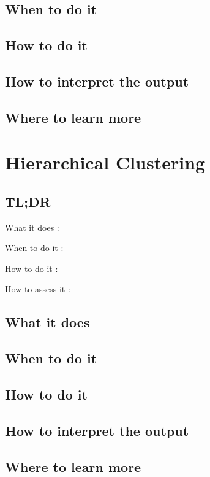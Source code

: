 \documentclass[
]{book}
\begin{document}
\hypertarget{when-to-do-it-22}{%
\section{When to do it}\label{when-to-do-it-22}}

\hypertarget{how-to-do-it-22}{%
\section{How to do it}\label{how-to-do-it-22}}

\hypertarget{how-to-interpret-the-output-22}{%
\section{How to interpret the output}\label{how-to-interpret-the-output-22}}

\hypertarget{where-to-learn-more-22}{%
\section{Where to learn more}\label{where-to-learn-more-22}}

\hypertarget{hierarchical-clustering}{%
\chapter{Hierarchical Clustering}\label{hierarchical-clustering}}

\hypertarget{tldr-23}{%
\section{TL;DR}\label{tldr-23}}

What it does
:

When to do it
:

How to do it
:

How to assess it
:

\hypertarget{what-it-does-23}{%
\section{What it does}\label{what-it-does-23}}

\hypertarget{when-to-do-it-23}{%
\section{When to do it}\label{when-to-do-it-23}}

\hypertarget{how-to-do-it-23}{%
\section{How to do it}\label{how-to-do-it-23}}

\hypertarget{how-to-interpret-the-output-23}{%
\section{How to interpret the output}\label{how-to-interpret-the-output-23}}

\hypertarget{where-to-learn-more-23}{%
\section{Where to learn more}\label{where-to-learn-more-23}}

  
\end{document}
